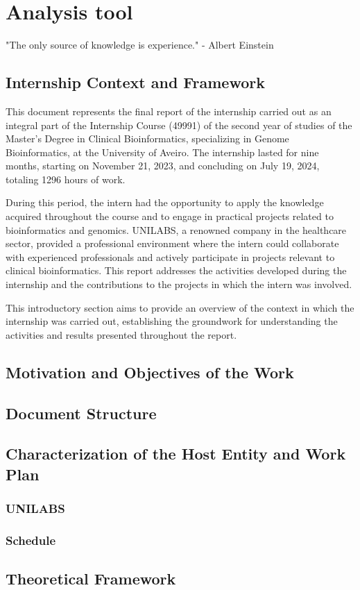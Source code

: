 \chapter{Analysis tool}
\label{chapter:Analysis tool}

\begin{introduction}
    "The only source of knowledge is experience." - Albert Einstein
\end{introduction}



\section{Internship Context and Framework}

This document represents the final report of the internship carried out as an integral part of the Internship Course (49991) of the second year of studies of the Master's Degree in Clinical Bioinformatics, specializing in Genome Bioinformatics, at the University of Aveiro. The internship lasted for nine months, starting on November 21, 2023, and concluding on July 19, 2024, totaling 1296 hours of work.

During this period, the intern had the opportunity to apply the knowledge acquired throughout the course and to engage in practical projects related to bioinformatics and genomics. UNILABS, a renowned company in the healthcare sector, provided a professional environment where the intern could collaborate with experienced professionals and actively participate in projects relevant to clinical bioinformatics. This report addresses the activities developed during the internship and the contributions to the projects in which the intern was involved.

This introductory section aims to provide an overview of the context in which the internship was carried out, establishing the groundwork for understanding the activities and results presented throughout the report.


\section{Motivation and Objectives of the Work}
\section{Document Structure}
\section{Characterization of the Host Entity and Work Plan}
\subsection{UNILABS}
\subsection{Schedule}
\section{Theoretical Framework}